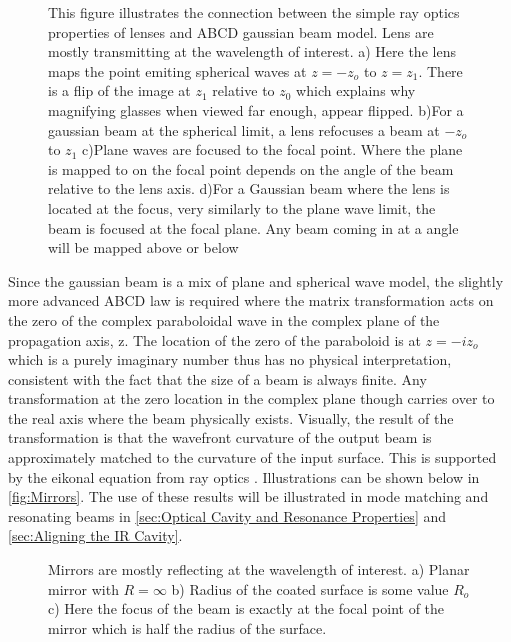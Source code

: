 \documentclass[11pt,a4paper]{book}
\newcommand{\imginput}[1]{} %
\begin{document}
		\begin{figure} [!ht]
			\centering
			\def\svgwidth{\columnwidth}
			\resizebox{160mm}{!}{\imginput{images/lens-reimage-focus.pdf_tex}}
			\caption{
				This figure illustrates the connection between the simple ray optics properties of lenses and ABCD gaussian beam model. Lens are mostly transmitting at the wavelength of interest.
				\newline 
				a) Here the lens maps the point emiting spherical waves at $z=-z_o$ to $z=z_1$. There is a flip of the image at $z_1$ relative to $z_0$ which explains why magnifying glasses when viewed far enough, appear flipped.
				\newline
				b)For a gaussian beam at the spherical limit, a lens refocuses a beam at $-z_o$ to $z_1$
				\newline
				c)Plane waves are focused to the focal point. Where the plane is mapped to on the focal point depends on the angle of the beam relative to the lens axis.
				\newline
				d)For a Gaussian beam where the lens is located at the focus, very similarly to the plane wave limit, the beam is focused at the focal plane. Any beam coming in at a angle will be mapped above or below}
			\label{fig:lens-reimage-focus}
		\end{figure}
		
		Since the gaussian beam is a mix of plane and spherical wave model, the slightly more advanced ABCD law is required where the matrix transformation acts on the zero of the complex paraboloidal wave in the complex plane of the propagation axis, z.
		The location of the zero of the paraboloid is at $z=-iz_o$ which is a purely imaginary number thus has no physical interpretation, consistent with the fact that the size of a beam is always finite.
		Any transformation at the zero location in the complex plane though carries over to the real axis where the beam physically exists.
		Visually, the result of the transformation is that the wavefront curvature of the output beam is approximately matched to the curvature of the input surface.
		This is supported by the eikonal equation from ray optics \cite{SalehTeichs}.
		Illustrations can be shown below in \autoref{fig:Mirrors}. 
		The use of these results will be illustrated in mode matching and resonating beams in \autoref{sec:Optical Cavity and Resonance Properties} and \autoref{sec:Aligning the IR Cavity}.
		
		\begin{figure} [!ht]
			\centering
			\def\svgwidth{\columnwidth}
			\resizebox{160mm}{!}{\imginput{images/Mirrors.pdf_tex}}
			\caption{\cite{SalehTeichs} Mirrors are mostly reflecting at the wavelength of interest.
				a) Planar mirror with $R=\infty$ \quad b) Radius of the coated surface is some value $R_o$ \quad c) Here the focus of the beam is exactly at the focal point of the mirror which is half the radius of the surface.
			}
			\label{fig:Mirrors}
		\end{figure}	
		
\end{document}
